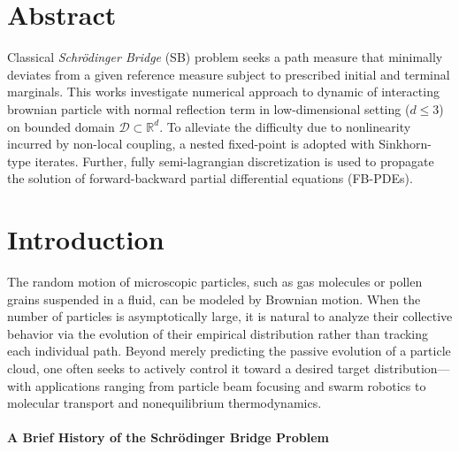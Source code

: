 \documentclass[10pt,a4paper]{article}
\begin{document}
\section{Abstract}

Classical \textit{Schrödinger Bridge} (SB) problem seeks a path measure that minimally deviates from a given reference measure subject to prescribed initial and terminal marginals. This works investigate numerical approach to dynamic of interacting brownian particle with normal reflection term in low-dimensional setting ($\displaystyle d\leqslant 3$) on bounded domain $\displaystyle \mathcal{D} \subset \mathbb{R}^{d}$. To alleviate the difficulty due to nonlinearity incurred by non-local coupling, a nested fixed-point is adopted with Sinkhorn-type iterates. Further, fully semi-lagrangian discretization is used to propagate the solution of forward-backward partial differential equations (FB-PDEs).

\section{Introduction}

The random motion of microscopic particles, such as gas molecules or pollen grains suspended in a fluid, can be modeled by Brownian motion. When the number of particles is asymptotically large, it is natural to analyze their collective behavior via the evolution of their empirical distribution rather than tracking each individual path. Beyond merely predicting the passive evolution of a particle cloud, one often seeks to actively control it toward a desired target distribution—with applications ranging from particle beam focusing and swarm robotics to molecular transport and nonequilibrium thermodynamics.

\paragraph{A Brief History of the Schrödinger Bridge Problem}
\end{document}
